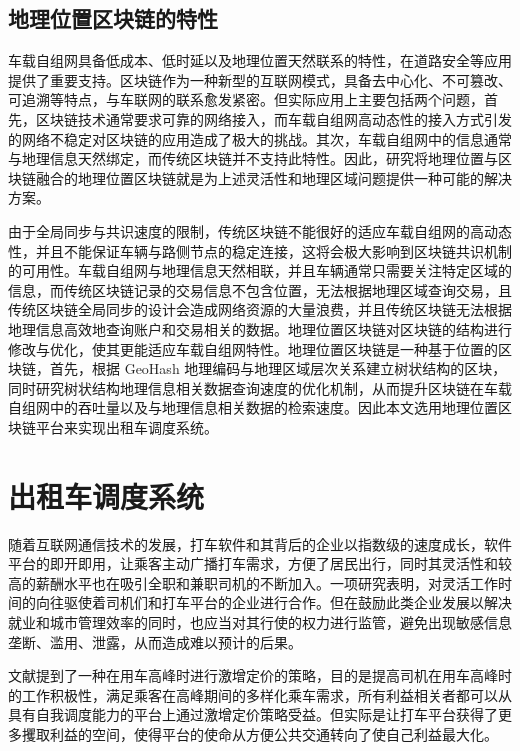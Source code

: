\subsection{地理位置区块链的特性}
车载自组网具备低成本、低时延以及地理位置天然联系的特性，在道路安全等应用提供了重要支持。区块链作为一种新型的互联网模式，具备去中心化、不可篡改、可追溯等特点，与车联网的联系愈发紧密。但实际应用上主要包括两个问题，首先，区块链技术通常要求可靠的网络接入，而车载自组网高动态性的接入方式引发的网络不稳定对区块链的应用造成了极大的挑战。其次，车载自组网中的信息通常与地理信息天然绑定，而传统区块链并不支持此特性。因此，研究将地理位置与区块链融合的地理位置区块链就是为上述灵活性和地理区域问题提供一种可能的解决方案。

由于全局同步与共识速度的限制，传统区块链不能很好的适应车载自组网的高动态性，并且不能保证车辆与路侧节点的稳定连接，这将会极大影响到区块链共识机制的可用性。车载自组网与地理信息天然相联，并且车辆通常只需要关注特定区域的信息，而传统区块链记录的交易信息不包含位置，无法根据地理区域查询交易，且传统区块链全局同步的设计会造成网络资源的大量浪费，并且传统区块链无法根据地理信息高效地查询账户和交易相关的数据。地理位置区块链对区块链的结构进行修改与优化，使其更能适应车载自组网特性。地理位置区块链是一种基于位置的区块链，首先，根据 GeoHash 地理编码与地理区域层次关系建立树状结构的区块，同时研究树状结构地理信息相关数据查询速度的优化机制，从而提升区块链在车载自组网中的吞吐量以及与地理信息相关数据的检索速度。因此本文选用地理位置区块链平台来实现出租车调度系统。

\section{出租车调度系统}
随着互联网通信技术的发展，打车软件和其背后的企业以指数级的速度成长，软件平台的即开即用，让乘客主动广播打车需求，方便了居民出行，同时其灵活性和较高的薪酬水平也在吸引全职和兼职司机的不断加入。一项研究表明，对灵活工作时间的向往驱使着司机们和打车平台的企业进行合作。但在鼓励此类企业发展以解决就业和城市管理效率的同时，也应当对其行使的权力进行监管，避免出现敏感信息垄断、滥用、泄露，从而造成难以预计的后果。

文献提到了一种在用车高峰时进行激增定价的策略，目的是提高司机在用车高峰时的工作积极性，满足乘客在高峰期间的多样化乘车需求，所有利益相关者都可以从具有自我调度能力的平台上通过激增定价策略受益。但实际是让打车平台获得了更多攫取利益的空间，使得平台的使命从方便公共交通转向了使自己利益最大化。

